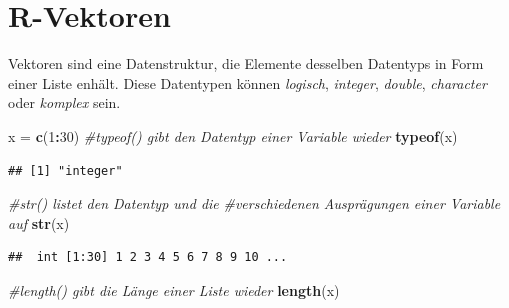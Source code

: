 \documentclass[]{book}
\newenvironment{Shaded}{\begin{snugshade}}{\end{snugshade}}
\newcommand{\KeywordTok}[1]{\textcolor[rgb]{0.13,0.29,0.53}{\textbf{#1}}}
\newcommand{\DecValTok}[1]{\textcolor[rgb]{0.00,0.00,0.81}{#1}}
\newcommand{\StringTok}[1]{\textcolor[rgb]{0.31,0.60,0.02}{#1}}
\newcommand{\CommentTok}[1]{\textcolor[rgb]{0.56,0.35,0.01}{\textit{#1}}}
\newcommand{\OperatorTok}[1]{\textcolor[rgb]{0.81,0.36,0.00}{\textbf{#1}}}
\newcommand{\NormalTok}[1]{#1}
\begin{document}
\begin{Shaded}
\end{Shaded}

\section{R-Vektoren}\label{r-vektoren}

Vektoren sind eine Datenstruktur, die Elemente desselben Datentyps in
Form einer Liste enhält. Diese Datentypen können \emph{logisch},
\emph{integer}, \emph{double}, \emph{character} oder \emph{komplex}
sein.

\begin{Shaded}
\begin{Highlighting}[]
\NormalTok{x =}\StringTok{ }\KeywordTok{c}\NormalTok{(}\DecValTok{1}\OperatorTok{:}\DecValTok{30}\NormalTok{)}
\CommentTok{#typeof() gibt den Datentyp einer Variable wieder }
\KeywordTok{typeof}\NormalTok{(x)}
\end{Highlighting}
\end{Shaded}

\begin{verbatim}
## [1] "integer"
\end{verbatim}

\begin{Shaded}
\begin{Highlighting}[]
\CommentTok{#str() listet den Datentyp und die }
\CommentTok{#verschiedenen Ausprägungen einer Variable auf}
\KeywordTok{str}\NormalTok{(x)}
\end{Highlighting}
\end{Shaded}

\begin{verbatim}
##  int [1:30] 1 2 3 4 5 6 7 8 9 10 ...
\end{verbatim}

\begin{Shaded}
\begin{Highlighting}[]
\CommentTok{#length() gibt die Länge einer Liste wieder}
\KeywordTok{length}\NormalTok{(x)}
\end{Highlighting}
\end{Shaded}
\end{document}
